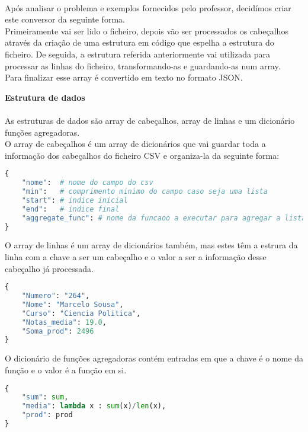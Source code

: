 \documentclass[11pt,a4paper]{report}
\begin{document}
\paragraph{}
Após analisar o problema e exemplos fornecidos pelo professor, decidímos criar este conversor da seguinte forma. \\
Primeiramente vai ser lido o ficheiro, depois vão ser processados os cabeçalhos através da criação de uma estrutura em código que espelha a estrutura do ficheiro. De seguida, a estrutura referida anteriormente vai utilizada para processar as linhas do ficheiro, transformando-as e guardando-as num array.\\
Para finalizar esse array é convertido em texto no formato JSON.\\

\item\textbf{Estrutura de dados}
\paragraph{}
As estruturas de dados são array de cabeçalhos, array de linhas e um dicionário funções agregadoras.  \\
O array de cabeçalhos é um array de dicionários que vai guardar toda a informação dos cabeçalhos do  
ficheiro CSV e organiza-la da seguinte forma: \\
\begin{lstlisting}[language=Python]
{
    "nome":  # nome do campo do csv
    "min":   # comprimento minimo do campo caso seja uma lista
    "start": # indice inicial
    "end":   # indice final
    "aggregate_func": # nome da funcaoo a executar para agregar a lista
}
\end{lstlisting}

O array de linhas é um array de dicionários também, mas estes têm a estrura da linha com a chave a ser um cabeçalho e o valor a ser a informação desse cabeçalho já processada.  \\
\begin{lstlisting}[language=Python]
{
    "Numero": "264",
    "Nome": "Marcelo Sousa",
    "Curso": "Ciencia Politica",
    "Notas_media": 19.0,
    "Soma_prod": 2496
}
\end{lstlisting}

O dicionário de funções agregadoras contém entradas em que a chave é o nome da função e o valor é a função em si. 

\begin{lstlisting}[language=Python]
{
    "sum": sum,
    "media": lambda x : sum(x)/len(x),
    "prod": prod
}
\end{lstlisting}
\end{document}
